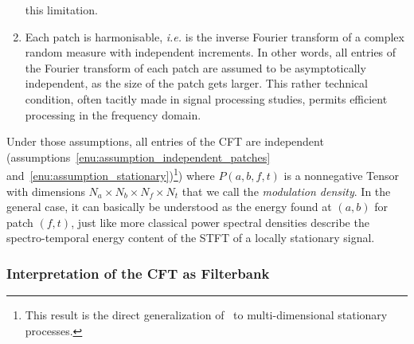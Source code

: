\begin{enumerate}[leftmargin=0cm,itemindent=.5cm,labelwidth=\itemindent,labelsep=0cm,align=left]
this limitation.\label{enu:assumption_stationary}
\item Each patch is harmonisable, \emph{i.e.} is the inverse Fourier
transform of a complex random measure with independent increments.
In other words, all entries of the Fourier transform of each patch
are assumed to be asymptotically independent, as the size of the patch
gets larger. This rather technical condition, often tacitly made in
signal processing studies, permits efficient processing in the frequency
domain.\label{enu:assumption_harmonisable}
\end{enumerate}

Under those assumptions, all entries of the CFT are independent
(assumptions~\ref{enu:assumption_independent_patches} and~\ref{enu:assumption_stationary})\footnote{This result is the direct generalization
of~\cite[th. 6.5.1]{samoradnitsky94} to multi-dimensional stationary processes.}) 
where $P\left(a,b,f,t\right)$ is a nonnegative Tensor with dimensions $N_{a}\times N_{b}\times N_{f}\times N_{t}$
 that we call the \emph{modulation density}. In
the general case, it can basically be understood as the energy found at $\left(a,b\right)$ for patch
$\left(f,t\right)$, just like more classical power spectral
densities describe the spectro-temporal energy content of the STFT
of a locally stationary signal.

\subsubsection{Interpretation of the CFT as Filterbank}
\label{sub:interpretation}

